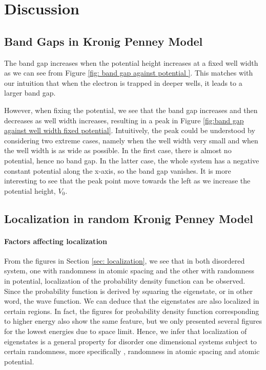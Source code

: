 \chapter{Discussion}\label{Ch:Discussion}



\section{Band Gaps in Kronig Penney Model}

The band gap increases when the potential height increases at a fixed well width as we can see from Figure \ref{fig: band gap against potential }. This matches with our intuition that when the electron is trapped in deeper wells, it leads to a larger band gap. 

However, when fixing the potential, we see that the band gap increases and then decreases as well width increases, resulting in a peak in Figure \ref{fig:band gap against well width fixed potential}. Intuitively, the peak could be understood by considering two extreme cases, namely when the well width very small and when the well width is as wide as possible. In the first case, there is almost no potential, hence no band gap. In the latter case, the whole system has a negative constant potential along the x-axis, so the band gap vanishes. It is more interesting to see that the peak point move towards the left as we increase the potential height, $V_0$. 


\section{Localization in random Kronig Penney Model}
\subsubsection{Factors affecting localization}\label{subsub:Factors affecting localization}
From the figures in Section \ref{sec: localization}, we see that in both disordered system, one with randomness in atomic spacing and the other with randomness in potential, localization of the probability density function can be observed. Since the probability function is derived by squaring the eigenstate, or in other word, the wave function. We can deduce that the eigenstates are also localized in certain regions. In fact, the figures for probability density function corresponding to higher energy also show the same feature, but we only presented several figures for the lowest energies due to space limit. Hence, we infer that localization of eigenstates is a general property for disorder one dimensional systems subject to certain randomness, more specifically , randomness in atomic spacing and atomic potential.

